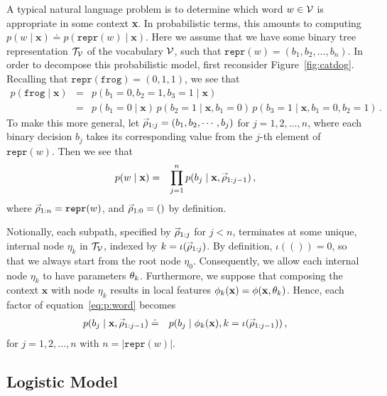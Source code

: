 \documentclass[a4paper]{article}
\newcommand{\rvec}[1]{\accentset{\rightarrow}{#1}}
\begin{document}
A typical natural language problem is to determine which word $w\in{\cal V}$ is appropriate in some context
\textbf{x}. In probabilistic terms, this amounts to computing $p(w\;|\;\textbf{x})\doteq p(\texttt{repr}(w)\;|\;\textbf{x})$.
Here we assume that we have some binary tree representation ${\cal T}_{\cal V}$ of the vocabulary ${\cal V}$,
such that $\texttt{repr}(w)=(b_1,b_2,\ldots,b_n)$.
In order to decompose this probabilistic model, first reconsider Figure~\ref{fig:catdog}.
Recalling that $\texttt{repr}(\texttt{frog})=(0,1,1)$, we see that
\begin{eqnarray}
p(\texttt{frog}\;|\;\textbf{x})
& = & p(b_1=0,b_2=1,b_3=1\;|\;\textbf{x})
\nonumber\\
& = & p(b_1=0\;|\;\textbf{x})\,p(b_2=1\;|\;\textbf{x},b_1=0)\,
p(b_3=1\;|\;\textbf{x},b_1=0,b_2=1)
\,.\nonumber
\end{eqnarray}
To make this more general, let $\rvec{\rho}_{1:j}=(b_1, b_2, \cdots, b_j)$ for $j=1,2,\ldots,n$,
where each binary decision $b_j$ takes its corresponding value from the $j$-th element of $\texttt{repr}(w)$.
Then we see that
\begin{eqnarray}
p(w\;|\;\textbf{x})
& = & \prod_{j=1}^n p(b_j\;|\;\textbf{x},\rvec{\rho}_{1:j-1})\,,
\label{eq:p:word}
\end{eqnarray}
where $\rvec{\rho}_{1:n}=\texttt{repr}(w)$, and $\rvec{\rho}_{1:0}=()$ by definition.

Notionally, each subpath, specified by $\rvec{\rho}_{1:j}$ for $j<n$,
terminates at some unique, internal node $\eta_k$ in ${\cal T}_{\cal V}$, indexed by
$k=\iota(\rvec{\rho}_{1:j})$. By definition, $\iota(())=0$, so that we always start from the root node $\eta_0$.
Consequently, we allow each internal node $\eta_k$ to have parameters ${\bf\theta}_k$.
Furthermore, we suppose that composing the context $\textbf{x}$ with node $\eta_k$
results in local features ${\bf\phi}_k({\bf x})={\bf\phi}({\bf x},{\bf\theta}_k)$.
Hence, each factor of equation~\eqref{eq:p:word} becomes
\begin{eqnarray}
p(b_j\;|\;\textbf{x},\rvec{\rho}_{1:j-1}) & \doteq &
p(b_j\;|\;{\bf\phi}_{k}({\bf x}),k=\iota(\rvec{\rho}_{1:j-1}))
\,,
\label{eq:p:word:term}
\end{eqnarray}
for $j=1,2,\ldots,n$ with $n=|\texttt{repr}(w)|$.

\subsection{Logistic Model}
\end{document}
